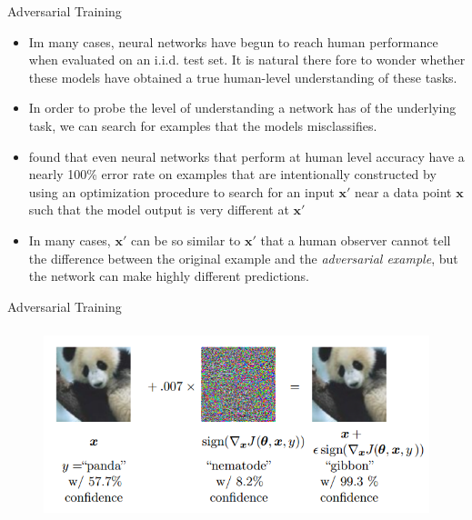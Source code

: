 \documentclass[10pt]{beamer}
\begin{document}
	\begin{frame}{Adversarial Training}
		\begin{itemize}
			\item Im many cases, neural networks have begun to reach human performance when evaluated on an i.i.d. test set. It is natural there fore to wonder whether these models have obtained a true human-level understanding of these tasks.
			\pause
			\item In order to probe the level of understanding a network has of the underlying task, we can search for examples that the models misclassifies.
			\pause
			\item \citet{szegedy2013intriguing} found that even neural networks that perform at human level accuracy have a nearly 100\% error rate on examples that are intentionally constructed by using an optimization procedure to search for an input $\bm{x'}$ near a data point $\bm{x}$ such that the model output is very different at $\bm{x'}$
			\pause
			\item In many cases, $\bm{x'}$ can be so similar to $\bm{x'}$ that a human observer cannot tell the difference between the original example and the \emph{adversarial example}, but the network can make highly different predictions.
		\end{itemize}
	\end{frame}
	
	\begin{frame}{Adversarial Training}
		\begin{figure}
			\includegraphics[height=15em]{figures/adversarial-example.png}
		\end{figure}
	\end{frame}
	
\end{document}
